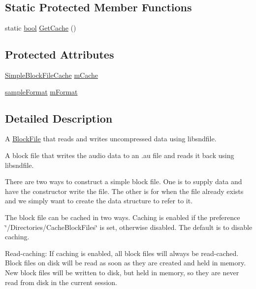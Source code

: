 \subsection*{Static Protected Member Functions}
\begin{DoxyCompactItemize}
\item 
static \hyperlink{mac_2config_2i386_2lib-src_2libsoxr_2soxr-config_8h_abb452686968e48b67397da5f97445f5b}{bool} \hyperlink{class_simple_block_file_a3c7bc7cce33cbbd6b4120ed3005b988f}{Get\+Cache} ()
\end{DoxyCompactItemize}
\subsection*{Protected Attributes}
\begin{DoxyCompactItemize}
\item 
\hyperlink{struct_simple_block_file_cache}{Simple\+Block\+File\+Cache} \hyperlink{class_simple_block_file_aa847bc2ca7232696fbebf79e6a72443b}{m\+Cache}
\item 
\hyperlink{include_2audacity_2_types_8h_a9938d2e2f6adef23e745cd80ef379792}{sample\+Format} \hyperlink{class_simple_block_file_ad40b5fc5ff95595d2717c0fa0dd75596}{m\+Format}
\end{DoxyCompactItemize}


\subsection{Detailed Description}
A \hyperlink{class_block_file}{Block\+File} that reads and writes uncompressed data using libsndfile. 

A block file that writes the audio data to an .au file and reads it back using libsndfile.

There are two ways to construct a simple block file. One is to supply data and have the constructor write the file. The other is for when the file already exists and we simply want to create the data structure to refer to it.

The block file can be cached in two ways. Caching is enabled if the preference \char`\"{}/\+Directories/\+Cache\+Block\+Files\char`\"{} is set, otherwise disabled. The default is to disable caching.

Read-\/caching\+: If caching is enabled, all block files will always be read-\/cached. Block files on disk will be read as soon as they are created and held in memory. New block files will be written to disk, but held in memory, so they are never read from disk in the current session.

